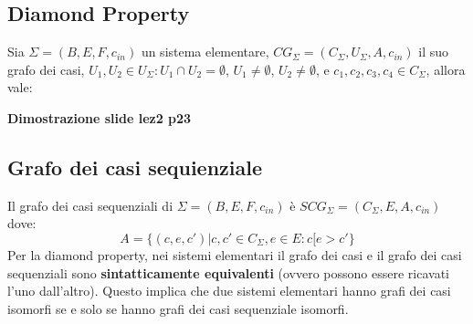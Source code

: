 \subsection{Diamond Property}
Sia $\Sigma = (B, E, F, c_{in})$ un sistema elementare, $CG_\Sigma = (C_\Sigma, U_\Sigma, A, c_{in})$ il suo grafo dei casi, $U_1, U_2 \in U_\Sigma : U_1 \cap U_2 = \emptyset$, $U_1 \neq \emptyset$, $U_2 \neq \emptyset$, e $c_1, c_2, c_3, c_4 \in C_\Sigma$, allora vale:
\begin{center}
\end{center}

\textbf{Dimostrazione slide lez2 p23}

\subsection{Grafo dei casi sequienziale}
Il grafo dei casi sequenziali di $\Sigma = (B, E, F, c_{in})$ è $SCG_\Sigma = (C_\Sigma, E, A, c_{in})$ dove:
\[
	A = \{ (c, e, c') | c, c' \in C_\Sigma, e \in E : c[e > c' \}
\]
\noindent
Per la diamond property, nei sistemi elementari il grafo dei casi e il grafo dei casi sequenziali sono \textbf{sintatticamente equivalenti} (ovvero possono essere ricavati l'uno dall'altro).
Questo implica che due sistemi elementari hanno grafi dei casi isomorfi se e solo se hanno grafi dei casi sequenziale isomorfi.

